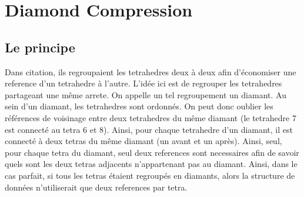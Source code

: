 \documentclass[a4paper,11pt,openany]{article}
\begin{document}
%
%


\section{Diamond Compression}
\subsection{Le principe}
Dans citation, ils regroupaient les tetrahedres deux à deux afin d'économiser une reference d'un tetrahedre à l'autre. L'idée ici est de regrouper les tetrahedres partageant une même arrete. On appelle un tel regroupement un diamant.
Au sein d'un diamant, les tetrahedres sont ordonnés. On peut donc oublier les références de voisinage entre deux tetrahedres du même diamant (le tetrahedre 7 est connecté au tetra 6 et 8).
Ainsi, pour chaque tetrahedre d'un diamant, il est connecté à deux tetras du même diamant (un avant et un après). Ainsi, seul, pour chaque tetra du diamant, seul deux references sont necessaires afin de savoir quels sont les deux tetras adjacents n'appartenant pas au diamant.
Ainsi, dans le cas parfait, si tous les tetras étaient regroupés en diamants, alors la structure de données n'utiliserait que deux references par tetra.
\end{document}
